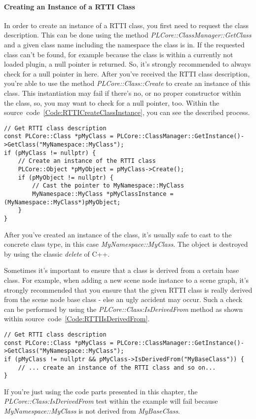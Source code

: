 \paragraph{Creating an Instance of a \ac{RTTI} Class}
In order to create an instance of a \ac{RTTI} class, you first need to request the class description. This can be done using the method \emph{PLCore::ClassManager::GetClass} and a given class name including the namespace the class is in. If the requested class can't be found, for example because the class is within a currently not loaded plugin, a null pointer is returned. So, it's strongly recommended to always check for a null pointer in here. After you've received the \ac{RTTI} class description, you're able to use the method \emph{PLCore::Class::Create} to create an instance of this class. This instantiation may fail if there's no, or no proper constructor within the class, so, you may want to check for a null pointer, too. Within the source~code~\ref{Code:RTTICreateClassInstance}, you can see the described process.
\begin{lstlisting}[float=htb,label=Code:RTTICreateClassInstance,caption={Creating an instance of a \ac{RTTI} class}]
// Get RTTI class description
const PLCore::Class *pMyClass = PLCore::ClassManager::GetInstance()->GetClass("MyNamespace::MyClass");
if (pMyClass != nullptr) {
	// Create an instance of the RTTI class
	PLCore::Object *pMyObject = pMyClass->Create();
	if (pMyObject != nullptr) {
		// Cast the pointer to MyNamespace::MyClass
		MyNamespace::MyClass *pMyClassInstance = (MyNamespace::MyClass*)pMyObject;
	}
}
\end{lstlisting}
After you've created an instance of the class, it's usually safe to cast to the concrete class type, in this case \emph{MyNamespace::MyClass}. The object is destroyed by using the classic \emph{delete} of C++.

Sometimes it's important to ensure that a class is derived from a certain base class. For example, when adding a new scene node instance to a scene graph, it's strongly recommended that you ensure that the given \ac{RTTI} class is really derived from the scene node base class - else an ugly accident may occur. Such a check can be performed by using the \emph{PLCore::Class:IsDerivedFrom} method as shown within source~code~\ref{Code:RTTIIsDerivedFrom}.
\begin{lstlisting}[float=htb,label=Code:RTTIIsDerivedFrom,caption={Ensure that a class is derived from a certain base class}]
// Get RTTI class description
const PLCore::Class *pMyClass = PLCore::ClassManager::GetInstance()->GetClass("MyNamespace::MyClass");
if (pMyClass != nullptr && pMyClass->IsDerivedFrom("MyBaseClass")) {
	// ... create an instance of the RTTI class and so on...
}
\end{lstlisting}
If you're just using the code parts presented in this chapter, the \emph{PLCore::Class:IsDerivedFrom} test within the example will fail because \emph{MyNamespace::MyClass} is not derived from \emph{MyBaseClass}.

